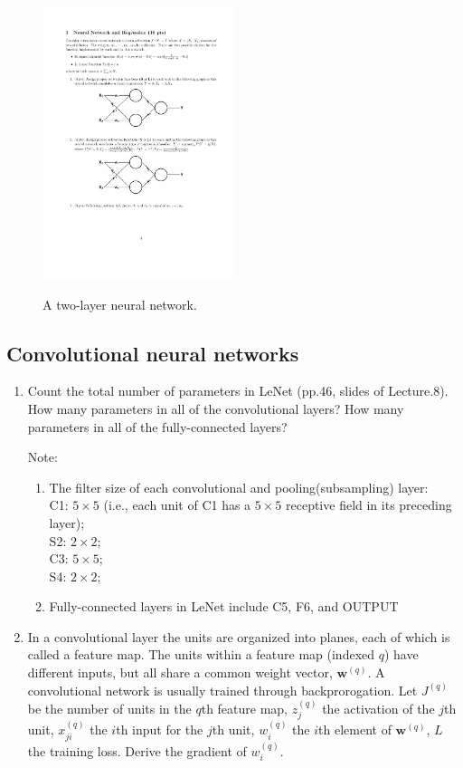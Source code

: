 \begin{figure}[!htp]
  \centering
  \includegraphics[width=0.5\textwidth]{Figure/nn}\\
  \caption{A two-layer neural network.}\label{nn}
\end{figure}

\subsection{Convolutional neural networks}

\begin{enumerate}
\item Count the total number of parameters in LeNet (pp.46, slides of Lecture.8). How many parameters in all of the convolutional layers? How many parameters in all of the fully-connected layers?
    
    {\color{red} 
    Note:
    \begin{enumerate}
    \item The filter size of each convolutional and pooling(subsampling) layer: \\
    C1: $5\times 5$ (i.e., each unit of C1 has a $5\times 5$ receptive field in its preceding layer);\\
    S2: $2\times 2$;\\
    C3: $5\times 5$;\\
    S4: $2\times 2$;
    \item Fully-connected layers in LeNet include C5, F6, and OUTPUT
    \end{enumerate}
    }

\item In a convolutional layer the units are organized into planes, each of which is called a feature map. The units within a feature map (indexed $q$) have different inputs, but all share a common weight vector, $\bm{w}^{(q)}$. A convolutional network is usually trained through backprorogation. Let $J^{(q)}$ be the number of units in the $q$th feature map, $z_{j}^{(q)}$ the activation of the $j$th unit, $x_{ji}^{(q)}$ the $i$th input for the $j$th unit, $w_i^{(q)}$ the $i$th element of $\bm{w}^{(q)}$, $L$ the training loss. Derive the gradient of $w_{i}^{(q)}$.
\end{enumerate}

